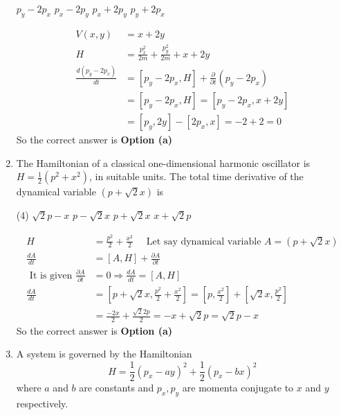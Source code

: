 \begin{enumerate}
\begin{tasks}
		\task[\textbf{a.}] $p_{y}-2 p_{x}$
		\task[\textbf{b.}] $p_{x}-2 p_{y}$
		\task[\textbf{c.}]$p_{x}+2 p_{y}$
		\task[\textbf{d.}]  $p_{y}+2 p_{x}$
	\end{tasks}
\begin{answer}
	\begin{align*}
	V(x, y)&=x+2 y\\
	H&=\frac{p_{x}^{2}}{2 m}+\frac{p_{y}^{2}}{2 m}+x+2 y\\
	\frac{d\left(p_{y}-2 p_{x}\right)}{d t}&=\left[p_{y}-2 p_{x}, H\right]+\frac{\partial}{\partial t}\left(p_{y}-2 p_{x}\right)\\
	&=\left[p_{y}-2 p_{x}, H\right]=\left[p_{y}-2 p_{x}, x+2 y\right]\\&=\left[p_{y}, 2 y\right]-\left[2 p_{x}, x\right]=-2+2=0
	\end{align*}
	So the correct answer is \textbf{Option (a)}
\end{answer}
	\item  The Hamiltonian of a classical one-dimensional harmonic oscillator is $H=\frac{1}{2}\left(p^{2}+x^{2}\right)$, in suitable units. The total time derivative of the dynamical variable $(p+\sqrt{2} x)$ is
	{}
	\begin{tasks}(4)
		\task[\textbf{a.}]$\sqrt{2} p-x$
		\task[\textbf{b.}] $p-\sqrt{2} x$
		\task[\textbf{c.}]$p+\sqrt{2} x$
		\task[\textbf{d.}]  $x+\sqrt{2} p$
	\end{tasks}
\begin{answer}
	\begin{align*}
	H&=\frac{p^{2}}{2}+\frac{x^{2}}{2} \quad\text{ Let say dynamical variable }A=(p+\sqrt{2} x)\\
	\frac{d A}{d t}&=[A, H]+\frac{\partial A}{\partial t}\\
	\text{	It is given }\frac{\partial A}{\partial t}&=0 \Rightarrow \frac{d A}{d t}=[A, H]\\
	\frac{d A}{d t}&=\left[p+\sqrt{2} x, \frac{p^{2}}{2}+\frac{x^{2}}{2}\right]=\left[p, \frac{x^{2}}{2}\right]+\left[\sqrt{2} x, \frac{p^{2}}{2}\right]\\
	&=\frac{-2 x}{2}+\frac{\sqrt{2} 2 p}{2}=-x+\sqrt{2} p=\sqrt{2} p-x
	\end{align*}
	So the correct answer is \textbf{Option (a)}
\end{answer}
	\item  A system is governed by the Hamiltonian
	$$
	H=\frac{1}{2}\left(p_{x}-a y\right)^{2}+\frac{1}{2}\left(p_{x}-b x\right)^{2}
	$$
	where $a$ and $b$ are constants and $p_{x}, p_{y}$ are momenta conjugate to $x$ and $y$ respectively.

\end{enumerate}
